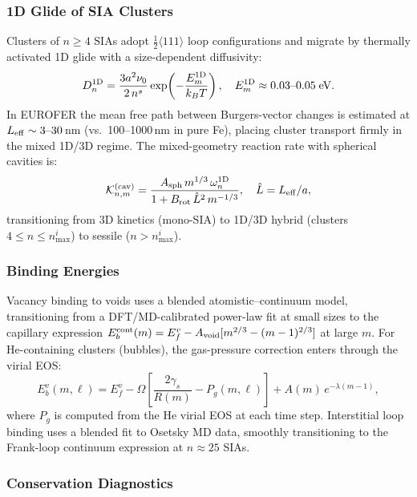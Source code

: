 \documentclass[12pt,letterpaper]{article}
\begin{document}
\subsubsection{1D Glide of SIA Clusters}

Clusters of $n \geq 4$ SIAs adopt $\frac{1}{2}\langle111\rangle$
loop configurations and migrate by thermally activated 1D glide with
a size-dependent diffusivity:
\begin{equation}
  D_n^{\rm 1D} = \frac{3a^2\nu_0}{2\,n^s}
    \exp\!\left(-\frac{E_m^{\rm 1D}}{k_BT}\right),
  \quad E_m^{\rm 1D} \approx 0.03\text{--}0.05\;\text{eV}.
\end{equation}
In EUROFER the mean free path between Burgers-vector changes is
estimated at $L_{\rm eff} \sim 3\text{--}30$\,nm (vs.\ 100--1000\,nm
in pure Fe), placing cluster transport firmly in the mixed 1D/3D
regime.  The mixed-geometry reaction rate with spherical cavities is:
\begin{equation}
  \mathcal{K}_{n,m}^{\rm (cav)}
  = \frac{A_{\rm sph}\,m^{1/3}\,\omega_n^{\rm 1D}}
         {1 + B_{\rm rot}\,\hat{L}^2\,m^{-1/3}},
  \quad \hat{L} = L_{\rm eff}/a,
\end{equation}
transitioning from 3D kinetics (mono-SIA) to 1D/3D hybrid (clusters
$4 \leq n \leq n_{\max}^i$) to sessile ($n > n_{\max}^i$).

\subsubsection{Binding Energies}

Vacancy binding to voids uses a blended atomistic--continuum model,
transitioning from a DFT/MD-calibrated power-law fit at small sizes
to the capillary expression $E_b^{\rm cont}(m) = E_f^v - A_{\rm void}
[m^{2/3}-(m-1)^{2/3}]$ at large $m$.  For He-containing clusters
(bubbles), the gas-pressure correction enters through the virial EOS:
\begin{equation}
  E_b^v(m,\ell) = E_f^v
    - \Omega\!\left[\frac{2\gamma_s}{R(m)} - P_g(m,\ell)\right]
    + A(m)\,e^{-\lambda(m-1)},
\end{equation}
where $P_g$ is computed from the He virial EOS at each time step.
Interstitial loop binding uses a blended fit to Osetsky MD data,
smoothly transitioning to the Frank-loop continuum expression at
$n \approx 25$ SIAs.

\subsubsection{Conservation Diagnostics}
\end{document}
